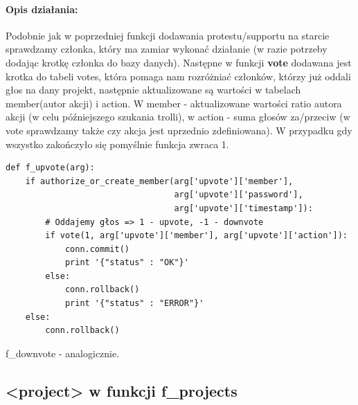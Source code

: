 \documentclass{article}
\begin{document}
\paragraph{Opis działania: }
Podobnie jak w poprzedniej funkcji dodawania protestu/supportu na starcie sprawdzamy członka, który ma zamiar wykonać działanie (w razie potrzeby dodając krotkę członka do bazy danych). \newline
Następne w funkcji \textbf{vote} dodawana jest krotka do tabeli votes, która pomaga nam rozróżniać członków, którzy już oddali głos na dany projekt, następnie aktualizowane są wartości w tabelach member(autor akcji) i action. W member - aktualizowane wartości ratio autora akcji (w celu późniejszego szukania trolli), w action - suma głosów za/przeciw (w vote sprawdzamy także czy akcja jest uprzednio zdefiniowana). W przypadku gdy wszystko zakończyło się pomyślnie funkcja zwraca 1.
\begin{verbatim}
def f_upvote(arg):
    if authorize_or_create_member(arg['upvote']['member'],
                                  arg['upvote']['password'], 
                                  arg['upvote']['timestamp']):
        # Oddajemy głos => 1 - upvote, -1 - downvote
        if vote(1, arg['upvote']['member'], arg['upvote']['action']):
            conn.commit()
            print '{"status" : "OK"}'
        else:
            conn.rollback()   
            print '{"status" : "ERROR"}'
    else:
        conn.rollback() 
\end{verbatim}
f\_downvote - analogicznie.








\newpage
\subsection{<project> w funkcji f\_projects }
\end{document}
